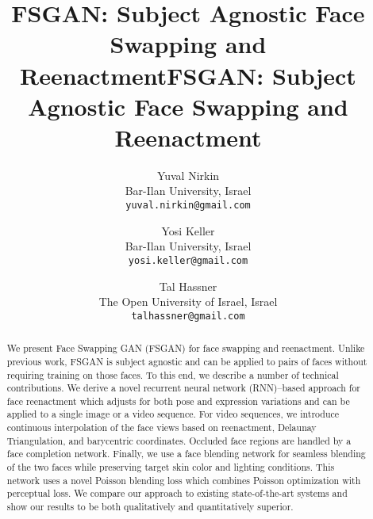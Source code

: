 \title{FSGAN: Subject Agnostic Face Swapping and Reenactment}



\makeatletter
\let\@oldmaketitle\@maketitle%
\renewcommand{\@maketitle}{\@oldmaketitle%
    \centering{\vspace{-5mm}\texttt{[image: figures/teaser\_01]}}
    \captionof{figure}{{\em Face swapping and reenactment.} Left: Source face swapped onto target. Right: Target video used to control the expressions of the face appearing in the source image. In both cases, our results appears in the middle. For more information please visit our website:~\url{https://nirkin.com/fsgan}.}\vspace{2mm}
    \label{fig:teaser}
    }
\makeatother

\title{FSGAN: Subject Agnostic Face Swapping and Reenactment}

\author{Yuval Nirkin\\
Bar-Ilan University, Israel\\
{\tt\small yuval.nirkin@gmail.com}
\and
Yosi Keller\\
Bar-Ilan University, Israel\\
{\tt\small yosi.keller@gmail.com}
\and
Tal Hassner\\
The Open University of Israel, Israel\\
{\tt\small talhassner@gmail.com}
}

\maketitle
\ificcvfinal\thispagestyle{empty}\fi

\begin{abstract}
We present Face Swapping GAN (FSGAN) for face swapping and reenactment. Unlike previous work, FSGAN is subject agnostic and can be applied to pairs of faces without requiring training on those faces. To this end, we describe a number of technical contributions. We derive a novel recurrent neural network (RNN)--based approach for face reenactment which adjusts for both pose and expression variations and can be applied to a single image or a video sequence. For video sequences, we introduce continuous interpolation of the face views based on reenactment, Delaunay Triangulation, and barycentric coordinates. Occluded face regions are handled by a face completion network. Finally, we use a face blending network for seamless blending of the two faces while preserving target skin color and lighting conditions. This network uses a novel Poisson blending loss which combines Poisson optimization with perceptual loss. We compare our approach to existing state-of-the-art systems and show our results to be both qualitatively and quantitatively superior.
\end{abstract}

